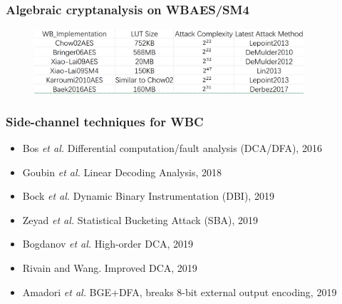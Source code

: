 \documentclass{beamer}
\begin{document}
\frame
{
\frametitle{Algebraic cryptanalysis on WBAES/SM4}
\begin{figure}[htbp]
\centering
  \includegraphics[width=10cm]{./pics/WBCCryptanlysis.png}
\end{figure}
}

\frame
{
\frametitle{Side-channel techniques for WBC}

\begin{itemize}
\item Bos \textit{et al.} Differential computation/fault analysis (DCA/DFA), 2016

\item Goubin \textit{et al.} Linear Decoding Analysis, 2018

\item Bock \textit{et al.} Dynamic Binary Instrumentation (DBI), 2019

\item Zeyad \textit{et al.} Statistical Bucketing Attack (SBA), 2019

\item Bogdanov \textit{et al.} High-order DCA, 2019

\item Rivain and Wang. Improved DCA, 2019

\item Amadori \textit{et al.} BGE+DFA, breaks 8-bit external output encoding, 2019

\end{itemize}

}
\end{document}
